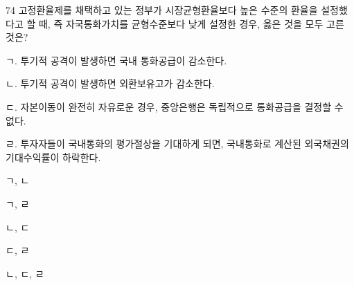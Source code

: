 \begin{question}{74}
고정환율제를 채택하고 있는 정부가 시장균형환율보다 높은 수준의 환율을 설정했다고 할 때, 즉 자국통화가치를 균형수준보다 낮게 설정한 경우, 옳은 것을 모두 고른 것은?
\begin{framedtext}
ㄱ. 투기적 공격이 발생하면 국내 통화공급이 감소한다. \par
ㄴ. 투기적 공격이 발생하면 외환보유고가 감소한다. \par
ㄷ. 자본이동이 완전히 자유로운 경우, 중앙은행은 독립적으로 통화공급을 결정할 수 없다. \par
ㄹ. 투자자들이 국내통화의 평가절상을 기대하게 되면, 국내통화로 계산된 외국채권의 기대수익률이 하락한다. \par
\end{framedtext}
\begin{choices}
  \item ㄱ, ㄴ
  \item ㄱ, ㄹ
  \item ㄴ, ㄷ
  \item ㄷ, ㄹ
  \item ㄴ, ㄷ, ㄹ
\end{choices}
\end{question}
